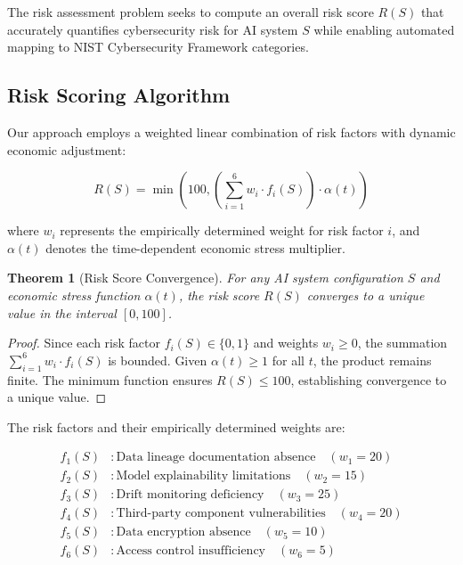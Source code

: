 \documentclass[11pt,letterpaper]{article}
\newtheorem{theorem}{Theorem}
\begin{document}
The risk assessment problem seeks to compute an overall risk score $R(S)$ that accurately quantifies cybersecurity risk for AI system $S$ while enabling automated mapping to NIST Cybersecurity Framework categories.

\subsection{Risk Scoring Algorithm}

Our approach employs a weighted linear combination of risk factors with dynamic economic adjustment:

\begin{equation}
R(S) = \min\left(100, \left(\sum_{i=1}^{6} w_i \cdot f_i(S)\right) \cdot \alpha(t)\right)
\end{equation}

where $w_i$ represents the empirically determined weight for risk factor $i$, and $\alpha(t)$ denotes the time-dependent economic stress multiplier.

\begin{theorem}[Risk Score Convergence]
For any AI system configuration $S$ and economic stress function $\alpha(t)$, the risk score $R(S)$ converges to a unique value in the interval $[0, 100]$.
\end{theorem}

\begin{proof}
Since each risk factor $f_i(S) \in \{0, 1\}$ and weights $w_i \geq 0$, the summation $\sum_{i=1}^{6} w_i \cdot f_i(S)$ is bounded. Given $\alpha(t) \geq 1$ for all $t$, the product remains finite. The minimum function ensures $R(S) \leq 100$, establishing convergence to a unique value.
\end{proof}

The risk factors and their empirically determined weights are:

\begin{align}
f_1(S) &: \text{Data lineage documentation absence} \quad (w_1 = 20) \\
f_2(S) &: \text{Model explainability limitations} \quad (w_2 = 15) \\
f_3(S) &: \text{Drift monitoring deficiency} \quad (w_3 = 25) \\
f_4(S) &: \text{Third-party component vulnerabilities} \quad (w_4 = 20) \\
f_5(S) &: \text{Data encryption absence} \quad (w_5 = 10) \\
f_6(S) &: \text{Access control insufficiency} \quad (w_6 = 5)
\end{align}
\end{document}
